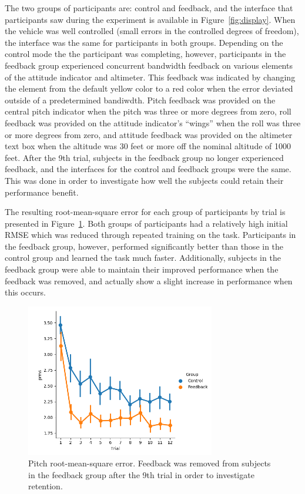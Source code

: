 The two groups of participants are: control and feedback, and the interface that participants saw during the experiment is available in Figure~\ref{fig:display}.
When the vehicle was well controlled (small errors in the controlled degrees of freedom), the interface was the same for participants in both groups.
Depending on the control mode the the participant was completing, however, participants in the feedback group experienced concurrent bandwidth feedback on various elements of the attitude indicator and altimeter.
This feedback was indicated by changing the element from the default yellow color to a red color when the error deviated outside of a predetermined bandiwdth.
Pitch feedback was provided on the central pitch indicator when the pitch was three or more degrees from zero, roll feedback was provided on the attitude indicator's ``wings'' when the roll was three or more degrees from zero, and attitude feedback was provided on the altimeter text box when the altitude was 30 feet or more off the nominal altitude of 1000 feet.
After the 9th trial, subjects in the feedback group no longer experienced feedback, and the interfaces for the control and feedback groups were the same.
This was done in order to investigate how well the subjects could retain their performance benefit.

The resulting root-mean-square error for each group of participants by trial is presented in Figure~\ref{fig:prmse}.
Both groups of participants had a relatively high initial RMSE which was reduced through repeated training on the task.
Participants in the feedback group, however, performed significantly better than those in the control group and learned the task much faster.
Additionally, subjects in the feedback group were able to maintain their improved performance when the feedback was removed, and actually show a slight increase in performance when this occurs.

\begin{figure}[t]
    \centering
    \includegraphics[width=3.25in]{figures/model_prms.png}
    \caption{Pitch root-mean-square error. Feedback was removed from subjects in the feedback group after the 9th trial in order to investigate retention.}
    \label{fig:prmse}
\end{figure}

